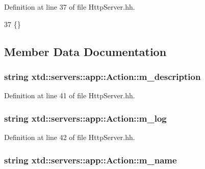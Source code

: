Definition at line 37 of file Http\-Server.\-hh.


\begin{DoxyCode}
37 \{\}
\end{DoxyCode}


\subsection{Member Data Documentation}
\hypertarget{classxtd_1_1servers_1_1app_1_1Action_a78d15b580f1f537cc273f05500a823e8}{
\subsubsection[{m\-\_\-description}]{\setlength{\rightskip}{0pt plus 5cm}string xtd\-::servers\-::app\-::\-Action\-::m\-\_\-description}}\label{classxtd_1_1servers_1_1app_1_1Action_a78d15b580f1f537cc273f05500a823e8}


Definition at line 41 of file Http\-Server.\-hh.

\hypertarget{classxtd_1_1servers_1_1app_1_1Action_a8ac7e4975e2fde1bb9237454bd99faec}{
\subsubsection[{m\-\_\-log}]{\setlength{\rightskip}{0pt plus 5cm}string xtd\-::servers\-::app\-::\-Action\-::m\-\_\-log}}\label{classxtd_1_1servers_1_1app_1_1Action_a8ac7e4975e2fde1bb9237454bd99faec}


Definition at line 42 of file Http\-Server.\-hh.

\hypertarget{classxtd_1_1servers_1_1app_1_1Action_a397748b5fd8412efcf779978ed4f4eef}{
\subsubsection[{m\-\_\-name}]{\setlength{\rightskip}{0pt plus 5cm}string xtd\-::servers\-::app\-::\-Action\-::m\-\_\-name}}\label{classxtd_1_1servers_1_1app_1_1Action_a397748b5fd8412efcf779978ed4f4eef}


